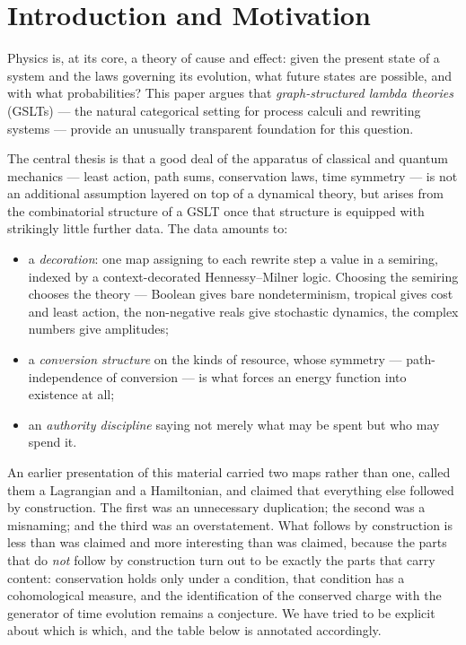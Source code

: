 \chapter{Introduction and Motivation}
\label{sec:causality-intro}

Physics is, at its core, a theory of cause and effect: given the present state
of a system and the laws governing its evolution, what future states are
possible, and with what probabilities?  This paper argues that
\emph{graph-structured lambda theories} (GSLTs) --- the natural categorical
setting for process calculi and rewriting systems --- provide an unusually
transparent foundation for this question.

The central thesis is that a good deal of the apparatus of classical and
quantum mechanics --- least action, path sums, conservation laws, time
symmetry --- is not an additional assumption layered on top of a dynamical
theory, but arises from the combinatorial structure of a GSLT once that
structure is equipped with strikingly little further data.  The data
amounts to:

\begin{itemize}[itemsep=2pt]
  \item a \emph{decoration}: one map assigning to each rewrite step a value
        in a semiring, indexed by a context-decorated Hennessy--Milner
        logic.  Choosing the semiring chooses the theory --- Boolean gives
        bare nondeterminism, tropical gives cost and least action,
        the non-negative reals give stochastic dynamics, the complex
        numbers give amplitudes;
  \item a \emph{conversion structure} on the kinds of resource, whose
        symmetry --- path-independence of conversion --- is what forces an
        energy function into existence at all;
  \item an \emph{authority discipline} saying not merely what may be spent
        but who may spend it.
\end{itemize}

An earlier presentation of this material carried two maps rather than one,
called them a Lagrangian and a Hamiltonian, and claimed that everything
else followed by construction.  The first was an unnecessary duplication;
the second was a misnaming; and the third was an overstatement.  What
follows by construction is less than was claimed and more interesting than
was claimed, because the parts that do \emph{not} follow by construction
turn out to be exactly the parts that carry content: conservation holds
only under a condition, that condition has a cohomological measure, and
the identification of the conserved charge with the generator of time
evolution remains a conjecture.  We have tried to be explicit about which
is which, and the table below is annotated accordingly.

